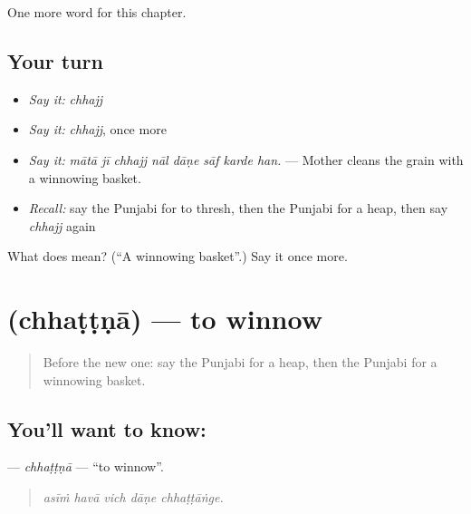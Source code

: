\begin{grammarlens}[title={What you've built}]
One more word for this chapter.
\end{grammarlens}

\subsection*{Your turn}
\begin{itemize}
\raggedright
  \item \emph{Say it:} \emph{chhajj}
  \item \emph{Say it:} \emph{chhajj}, once more
  \item \emph{Say it:} \emph{mātā jī chhajj nāl dāṇe sāf karde han.} — Mother cleans the grain with a winnowing basket.
  \item \emph{Recall:} say the Punjabi for to thresh, then the Punjabi for a heap, then say \emph{chhajj} again
\end{itemize}

\begin{tcolorbox}[breakable,colback=teal!4,colframe=teal!35!black,title={Before you move on}]
What does  mean? (\textquotedblleft{}A winnowing basket\textquotedblright{}.) Say it once more.
\end{tcolorbox}
\section[\texorpdfstring{\pa{ਛੱਟਣਾ} (chhaṭṭṇā)}{ਛੱਟਣਾ (chhaṭṭṇā)}]{ (chhaṭṭṇā) — to winnow}

\label{lesson:PA-C306-chhattna}



\begin{quote}
Before the new one: say the Punjabi for a heap, then the Punjabi for a winnowing basket.
\end{quote}

\subsection*{You'll want to know: }
\textbf{} — \emph{chhaṭṭṇā} — \textquotedblleft{}to winnow\textquotedblright{}.

\begin{quote}
    
\end{quote}

\begin{quote}
\emph{asīṁ havā vich dāṇe chhaṭṭāṅge.}
\end{quote}

